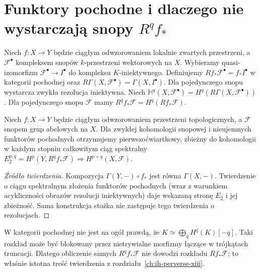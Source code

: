 \section{Funktory pochodne i dlaczego nie wystarczają snopy \texorpdfstring{$R^qf_*$}{Rq f*}}
\begin{definicja}
Niech $f:X\to Y$ będzie ciągłym odwzorowaniem
lokalnie zwartych przestrzeni, a $\mathcal F^\bullet$
kompleksem snopów $k$-przestrzeni wektorowych na $X$.
Wybieramy quasi-izomorfizm
$\mathcal F^\bullet\to I^\bullet$ do kompleksu
$K$-iniektywnego. Definiujemy
$Rf_*\mathcal F^\bullet=f_*I^\bullet$ w kategorii pochodnej
oraz $R\Gamma(X,\mathcal F^\bullet)=\Gamma(X,I^\bullet)$.
Dla pojedynczego snopu wystarcza zwykła
rezolucja iniektywna.
Niech $\mathbb H^q(X,\mathcal F^\bullet)=
H^q(R\Gamma(X,\mathcal F^\bullet))$.
Dla pojedynczego snopu $\mathcal F$ mamy
$R^qf_*\mathcal F=H^q(Rf_*\mathcal F)$.
\end{definicja}
\begin{twierdzenie}
\label{thm:leray-derived-xiv}
Niech $f:X\to Y$ będzie ciągłym odwzorowaniem
przestrzeni topologicznych, a $\mathcal F$ snopem grup
abelowych na $X$. Dla zwykłej kohomologii snopowej
i nieujemnych funktorów pochodnych otrzymujemy
pierwszoćwiartkowy, zbieżny do kohomologii w każdym
stopniu całkowitym ciąg spektralny
$E_2^{p,q}=H^p(Y,R^qf_*\mathcal F)
\Rightarrow H^{p+q}(X,\mathcal F)$.
\end{twierdzenie}
\begin{proof}[Źródło twierdzenia]
Kompozycja $\Gamma(Y,-)\circ f_*$ jest równa
$\Gamma(X,-)$. Twierdzenie o ciągu spektralnym
złożenia funktorów pochodnych (wraz z warunkiem
acykliczności obrazów rezolucji iniektywnych)
daje wskazaną stronę $E_2$ i jej zbieżność.
Sama konstrukcja stożka nie zastępuje tego
twierdzenia o rezolucjach.
\end{proof}
\begin{uwaga}
W kategorii pochodnej nie jest na ogół prawdą, że
$K\simeq\bigoplus_qH^q(K)[-q]$.
Taki rozkład może być blokowany przez nietrywialne
morfizmy łączące w trójkątach truncacji.
Dlatego obliczenie samych $R^qf_*\mathcal F$ nie dowodzi
rozkładu $Rf_*\mathcal F$; to właśnie istotna treść
twierdzenia z rozdziału~\ref{ch:ih-perverse-xiii}.
\end{uwaga}


